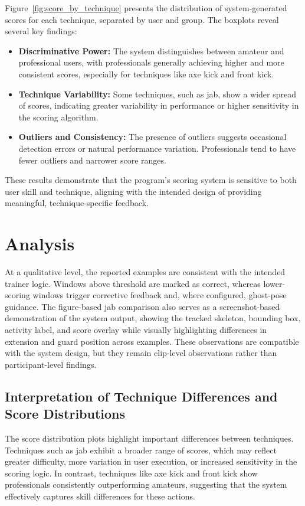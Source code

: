 \documentclass[12pt]{article}
\begin{document}
Figure~\ref{fig:score_by_technique} presents the distribution of system-generated scores for each technique, separated by user and group. The boxplots reveal several key findings:

\begin{itemize}
    \item \textbf{Discriminative Power:} The system distinguishes between amateur and professional users, with professionals generally achieving higher and more consistent scores, especially for techniques like axe kick and front kick.
    \item \textbf{Technique Variability:} Some techniques, such as jab, show a wider spread of scores, indicating greater variability in performance or higher sensitivity in the scoring algorithm.
    \item \textbf{Outliers and Consistency:} The presence of outliers suggests occasional detection errors or natural performance variation. Professionals tend to have fewer outliers and narrower score ranges.
\end{itemize}

These results demonstrate that the program’s scoring system is sensitive to both user skill and technique, aligning with the intended design of providing meaningful, technique-specific feedback.


\section{Analysis}
At a qualitative level, the reported examples are consistent with the intended trainer logic. Windows above threshold are marked as correct, whereas lower-scoring windows trigger corrective feedback and, where configured, ghost-pose guidance. The figure-based jab comparison also serves as a screenshot-based demonstration of the system output, showing the tracked skeleton, bounding box, activity label, and score overlay while visually highlighting differences in extension and guard position across examples. These observations are compatible with the system design, but they remain clip-level observations rather than participant-level findings.

\subsection*{Interpretation of Technique Differences and Score Distributions}

The score distribution plots highlight important differences between techniques. Techniques such as jab exhibit a broader range of scores, which may reflect greater difficulty, more variation in user execution, or increased sensitivity in the scoring logic. In contrast, techniques like axe kick and front kick show professionals consistently outperforming amateurs, suggesting that the system effectively captures skill differences for these actions.
\end{document}
